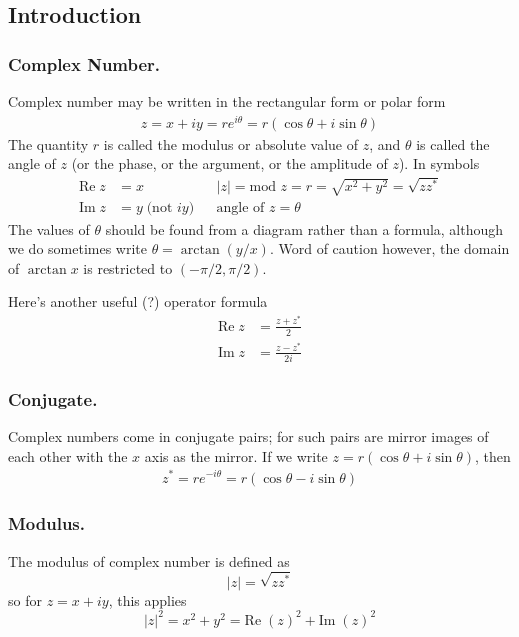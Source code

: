 \documentclass[../../../main.tex]{subfiles}
\begin{document}
\subsection{Introduction}
\subsubsection{Complex Number.} Complex number may be written in the rectangular form or polar form
\begin{align*}
    z=x+i y=re^{i\theta}=r(\cos\theta+i\sin\theta)
\end{align*}
The quantity $r$ is called the modulus or absolute value of $z$, and $\theta$ is called the angle of $z$ (or the phase, or the argument, or the amplitude of $z$). In symbols
\begin{align*}
    \mathrm{Re}\; z & =x                      &  & |z|=\text{mod } z=r=\sqrt{x^2+y^2}=\sqrt{zz^*} \\
    \mathrm{Im}\; z & =y\;\textrm{(not $iy$)} &  & \text{angle of } z=\theta
\end{align*}
The values of $\theta$ should be found from a diagram rather than a formula, although we do sometimes write $\theta = \arctan(y/x)$. Word of caution however, the domain of $\arctan x$ is restricted to $(-\pi/2, \pi/2)$.

Here's another useful (?) operator formula
\begin{align*}
    \mathrm{Re}\; z & =\frac{z+z^*}{2}  \\
    \mathrm{Im}\; z & =\frac{z-z^*}{2i}
\end{align*}

\subsubsection{Conjugate.} Complex numbers come in conjugate pairs; for such pairs are mirror images of each other with the $x$ axis as the mirror. If we write $z = r(\cos \theta + i \sin \theta)$, then
\begin{align*}
    z^*=re^{-i\theta}=r(\cos\theta-i\sin\theta)
\end{align*}

\subsubsection{Modulus.}
The modulus of complex number is defined as
\begin{equation*}
    |z|=\sqrt{zz ^*}
\end{equation*}
so for $z=x+iy$, this applies
\begin{equation*}
    |z|^2 = x^2 + y^2 = \mathrm{Re} \;(z)^2 +\mathrm{Im} \;(z)^2
\end{equation*}
\end{document}
